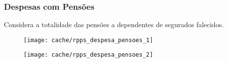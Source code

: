 
\subsubsection{Despesas com Pensões}

Considera a totalidade das pensões a dependentes de segurados falecidos.





\begin{figure}[H]
\center
\texttt{[image: cache/rpps\_despesa\_pensoes\_1]}
\end{figure}

\begin{figure}[H]
\center
\texttt{[image: cache/rpps\_despesa\_pensoes\_2]}
\end{figure}

